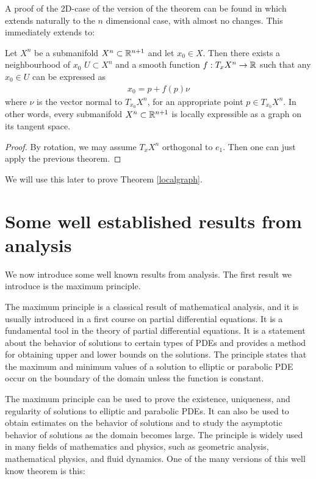 A proof of the 2D-case of the version of the theorem can be found in \cite{DoCarmo} which extends naturally to the $n$ dimensional case, with almost no changes. This immediately extends to:

\begin{cor}
	Let $X^n$ be a submanifold $X^n\subset\mathbb{R}^{n+1}$ and let $x_0\in X$. Then there exists a neighbourhood of $x_0$ $U\subset X^n$ and a smooth function $f: T_x X^n\rightarrow \mathbb{R}$ such that any $x_0\in U$ can be expressed as \label{localgraphcorollary}
	\begin{align*}
		x_0= p + f(p) \nu 
	\end{align*}
	where $\nu$ is the vector normal to $T_{x_0} X^n$, for an appropriate point $p\in T_{x_0} X^n$. 
	In other words, every submanifold $X^n\subset\mathbb{R}^{n+1}$ is locally expressible as a graph on its tangent space. 
\end{cor}

\begin{proof}
	By rotation, we may assume $T_x X^n$ orthogonal to $e_1$. Then one can just apply the previous theorem. 
\end{proof}

We will use this later to prove Theorem \ref{localgraph}. 


\section{Some well established results from analysis}

We now introduce some well known results from analysis. The first result we introduce is the maximum principle.

The maximum principle is a classical result of mathematical analysis, and it is usually introduced in a first course on partial differential equations. It is a fundamental tool in the theory of partial differential equations. It is a statement about the behavior of solutions to certain types of PDEs and provides a method for obtaining upper and lower bounds on the solutions. The principle states that the maximum and minimum values of a solution to elliptic or parabolic PDE occur on the boundary of the domain unless the function is constant. 

The maximum principle can be used to prove the existence, uniqueness, and regularity of solutions to elliptic and parabolic PDEs. It can also be used to obtain estimates on the behavior of solutions and to study the asymptotic behavior of solutions as the domain becomes large. The principle is widely used in many fields of mathematics and physics, such as geometric analysis, mathematical physics, and fluid dynamics. One of the many versions of this well know theorem is this: 

